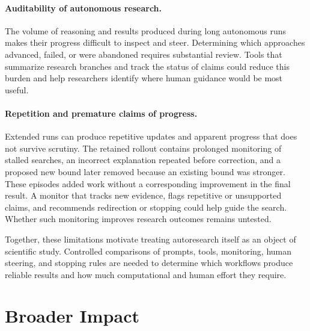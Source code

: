 \documentclass{article}
\theoremstyle{definition}
\theoremstyle{plain}
\begin{document}

\paragraph{Auditability of autonomous research.}
The volume of reasoning and results produced during long autonomous runs makes their progress difficult to inspect and steer. Determining which approaches advanced, failed, or were abandoned requires substantial review. Tools that summarize research branches and track the status of claims could reduce this burden and help researchers identify where human guidance would be most useful.

\paragraph{Repetition and premature claims of progress.}
Extended runs can produce repetitive updates and apparent progress that does not survive scrutiny. The retained rollout contains prolonged monitoring of stalled searches, an incorrect explanation repeated before correction, and a proposed new bound later removed because an existing bound was stronger. These episodes added work without a corresponding improvement in the final result. A monitor that tracks new evidence, flags repetitive or unsupported claims, and recommends redirection or stopping could help guide the search. Whether such monitoring improves research outcomes remains untested.

Together, these limitations motivate treating autoresearch itself as an object of scientific study. Controlled comparisons of prompts, tools, monitoring, human steering, and stopping rules are needed to determine which workflows produce reliable results and how much computational and human effort they require.




\clearpage
\section{Broader Impact}
\end{document}
